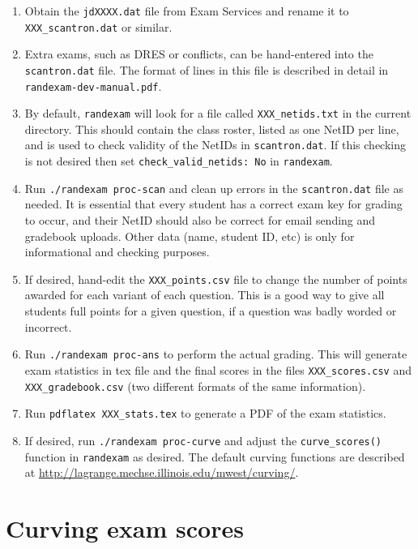 \documentclass{article}
\begin{document}
\begin{enumerate}
\item Obtain the \texttt{jdXXXX.dat} file from Exam Services and
  rename it to \texttt{XXX_scantron.dat} or similar.
\item Extra exams, such as DRES or conflicts, can be hand-entered into
  the \texttt{scantron.dat} file. The format of lines in this file is
  described in detail in \texttt{randexam-dev-manual.pdf}.
\item By default, \texttt{randexam} will look for a file called
  \texttt{XXX_netids.txt} in the current directory. This should
  contain the class roster, listed as one NetID per line, and is used
  to check validity of the NetIDs in \texttt{scantron.dat}. If this
  checking is not desired then set \texttt{check_valid_netids: No}
  in \texttt{randexam}.
\item Run \texttt{./randexam proc-scan} and clean up errors in the
  \texttt{scantron.dat} file as needed. It is essential that every
  student has a correct exam key for grading to occur, and their NetID
  should also be correct for email sending and gradebook
  uploads. Other data (name, student ID, etc) is only for
  informational and checking purposes.
\item If desired, hand-edit the \texttt{XXX_points.csv} file to change the
  number of points awarded for each variant of each question. This is
  a good way to give all students full points for a given question, if
  a question was badly worded or incorrect.
\item Run \texttt{./randexam proc-ans} to perform the actual
  grading. This will generate exam statistics in tex file and the
  final scores in the files \texttt{XXX_scores.csv} and
  \texttt{XXX_gradebook.csv} (two different formats of the same
  information).
\item Run \texttt{pdflatex XXX_stats.tex} to generate a PDF of the
  exam statistics.
\item If desired, run \texttt{./randexam proc-curve} and adjust the
  \texttt{curve_scores()} function in \texttt{randexam} as
  desired. The default curving functions are described at
  \url{http://lagrange.mechse.illinois.edu/mwest/curving/}.
\end{enumerate}

\section{Curving exam scores}
\end{document}
